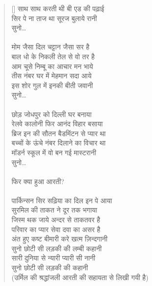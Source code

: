 \begin{verse}[\versewidth]
{साथ साथ करती थी बी एड की पढ़ाई\\
सिर पे ना ताज था सूरज बुलाये रानी\\
सुनो…\\
\\
मोम जैसा दिल चट्टान जैसा सर है\\
बाल धो के निकली तेल से वो तर है\\
आम चूसे निम्बू का आचार मन भाये\\
तीस नंबर घर में मेहमान सदा आये\\
इस शोर गुल में इनकी बीती जवानी\\
सुनो…\\
\\
छोड़ जोधपुर को दिल्ली घर बनाया\\
रेलवे कालोनी फिर आनंद विहार बसाया\\
ब्रिज इन की सौतन बैडमिंटन से प्यार था\\
बच्चों के ऊंचे नंबर दिलाने का विचार था\\
मॉडर्न स्कूल में वो बन गई मास्टरानी\\
सुनो…\\
\\
फिर क्या हुआ आरती?\\
\\
पार्किन्सन सिर सढ़िया का दिल इन पे आया\\
सुरमिल की ताकत ने दूर तक भगाया\\
जिस्म थक जाये अन्दर से ताकतवर है\\
परिवार का प्यार सेवा दवा का असर है\\
अंत हुए कष्ट बीमारी करे खत्म ज़िन्दगानी\\
सुनो छोटी सी लड़की की लम्बी कहानी\\
सारी दुनिया से न्यारी प्यारी सी नानी\\
सुनो छोटी सी लड़की की कहानी\\
(उर्मिल की श्रद्धांजली आरती की सहायता से
लिखी गयी है)
}
\end{verse}


